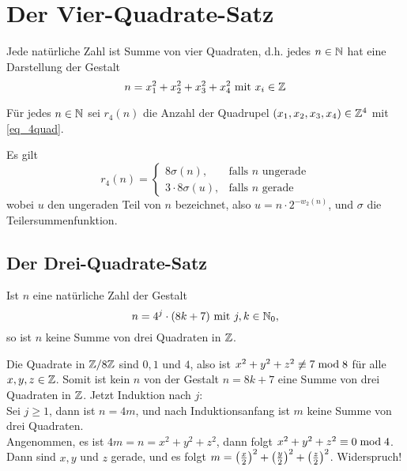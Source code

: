 \section{Der Vier-Quadrate-Satz}
\label{sec:para9}

\begin{satz} \label{satz_langrange}
	Jede natürliche Zahl ist Summe von vier Quadraten, d.h. jedes $n \in \mathbb{N}$ hat eine Darstellung der Gestalt 
	\begin{equation}
		n = x_1^2 + x_2^2 + x_3^2 + x_4^2 \text{ mit } x_i \in \mathbb{Z} \label{eq_4quad}
	\end{equation}
\end{satz}

\begin{defn}
	Für jedes $n \in \mathbb{N}$ sei $r_4(n)$ die Anzahl der Quadrupel $(x_1,x_2,x_3,x_4) \in \mathbb{Z}^4$ mit \eqref{eq_4quad}.
\end{defn}

\begin{lemma}
	Es gilt
	\begin{equation}
		r_4(n) = \begin{cases}
			8\sigma(n), & \text{falls } n \text{ ungerade} \\
			3\cdot 8 \sigma(u), & \text{falls } n \text{ gerade}
		\end{cases} \label{eq_jacobiformel}
	\end{equation}
	wobei $u$ den ungeraden Teil von $n$ bezeichnet, also $u = n \cdot 2^{-w_2(n)}$, und $\sigma$ die Teilersummenfunktion.
\end{lemma}

\subsection{Der Drei-Quadrate-Satz}

\begin{falko} \label{F10.1}
	Ist $n$ eine natürliche Zahl der Gestalt
	\begin{equation}
		n = 4^j \cdot (8k + 7) \text{ mit } j,k \in \mathbb{N}_0, \label{eq_F10.1}
	\end{equation}
	so ist $n$ keine Summe von drei Quadraten in $\mathbb{Z}$.
\end{falko}

Die Quadrate in $\mathbb{Z}/8\mathbb{Z}$ sind $0, 1$ und $4$, also ist $x^2+y^2+z^2 \not\equiv 7 \bmod 8$ für alle $x,y,z \in \mathbb{Z}$. Somit ist kein $n$ von der Gestalt $n = 8k+7$ eine Summe von drei Quadraten in $\mathbb{Z}$. 
Jetzt Induktion nach $j$: \\
Sei $j \geq 1$, dann ist $n = 4m$, und nach Induktionsanfang ist $m$ keine Summe von drei Quadraten. \\
Angenommen, es ist $4m = n = x^2+y^2+z^2$, dann folgt $x^2+y^2+z^2 \equiv 0 \bmod 4$. Dann sind $x,y$ und $z$ gerade, und es folgt $m = \left(\frac{x}{2}\right)^2 + \left(\frac{y}{2}\right)^2 + \left(\frac{z}{2}\right)^2$. Widerspruch!

